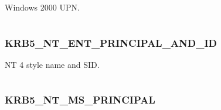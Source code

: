 \documentclass[letterpaper,10pt,english]{sphinxmanual}
\begin{document}
\begin{fulllineitems}
\label{appdev/refs/macros/KRB5_NT_ENTERPRISE_PRINCIPAL:KRB5_NT_ENTERPRISE_PRINCIPAL}
\end{fulllineitems}


Windows 2000 UPN.

\begin{tabulary}{\linewidth}{|L|L|}
\hline

 & 
\\\hline
\end{tabulary}



\subsubsection{KRB5\_NT\_ENT\_PRINCIPAL\_AND\_ID}
\label{appdev/refs/macros/KRB5_NT_ENT_PRINCIPAL_AND_ID:krb5-nt-ent-principal-and-id-data}\label{appdev/refs/macros/KRB5_NT_ENT_PRINCIPAL_AND_ID::doc}\label{appdev/refs/macros/KRB5_NT_ENT_PRINCIPAL_AND_ID:krb5-nt-ent-principal-and-id}

\begin{fulllineitems}
\label{appdev/refs/macros/KRB5_NT_ENT_PRINCIPAL_AND_ID:KRB5_NT_ENT_PRINCIPAL_AND_ID}
\end{fulllineitems}


NT 4 style name and SID.

\begin{tabulary}{\linewidth}{|L|L|}
\hline

 & 
\\\hline
\end{tabulary}



\subsubsection{KRB5\_NT\_MS\_PRINCIPAL}
\label{appdev/refs/macros/KRB5_NT_MS_PRINCIPAL::doc}\label{appdev/refs/macros/KRB5_NT_MS_PRINCIPAL:krb5-nt-ms-principal}\label{appdev/refs/macros/KRB5_NT_MS_PRINCIPAL:krb5-nt-ms-principal-data}

\begin{fulllineitems}
\label{appdev/refs/macros/KRB5_NT_MS_PRINCIPAL:KRB5_NT_MS_PRINCIPAL}
\end{fulllineitems}
\end{document}
